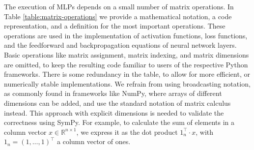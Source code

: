 \documentclass{article}
\newcommand{\Reals}{\mathbb{R}}
\begin{document}
The execution of MLPs depends on a small number of matrix operations. In Table \ref{table:matrix-operations} we provide a mathematical notation, a code representation, and a definition for the most important operations. These operations are used in the implementation of activation functions, loss functions, and the feedforward and backpropagation equations of neural network layers. Basic operations like matrix assignment, matrix indexing, and matrix dimensions are omitted, to keep the resulting code familiar to users of the respective Python frameworks. There is some redundancy in the table, to allow for more efficient, or numerically stable implementations.
We refrain from using broadcasting notation, as commonly found in frameworks like NumPy, where arrays of different dimensions can be added, and use the standard notation of matrix calculus instead.
This approach with explicit dimensions is needed to validate the correctness using SymPy.
For example, to calculate the sum of elements in a column vector $x \in \Reals^{n \times 1}$, we express it as the dot product $1_n^\top \cdot x$, with $1_n = (1, \ldots, 1)^\top$  a column vector of ones.

\clearpage
\end{document}

